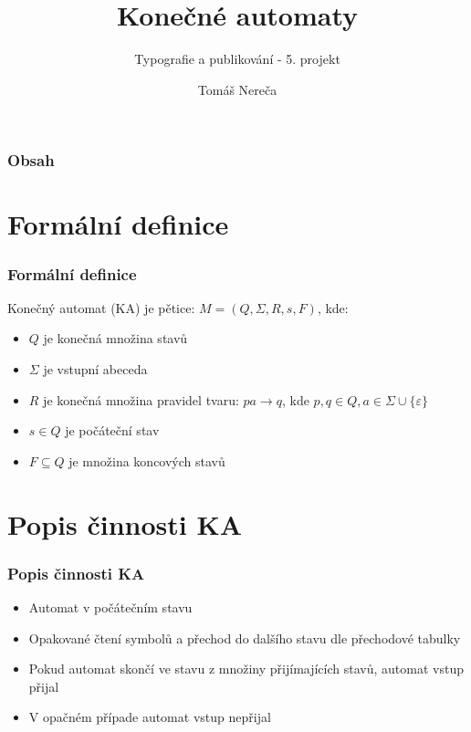 \documentclass{beamer}
\begin{document}
	\begin{frame}
		\title{Konečné automaty}
		\subtitle{Typografie a publikování - 5. projekt}
		\author{Tomáš Nereča}
		\maketitle
	\end{frame}
	
	\begin{frame}
		\frametitle{Obsah}
		\tableofcontents
	\end{frame}

	\section{Formální definice}
	\begin{frame}
		\frametitle{Formální definice}
		Konečný automat (KA) je pětice:
		$M = (Q, \Sigma, R, s, F)$, kde:
		\begin{itemize}
			\item $Q$ je konečná množina stavů
			\item $\Sigma$ je vstupní abeceda
			\item $R$ je konečná množina pravidel tvaru: $pa\rightarrow q$,
			kde $p, q \in Q, a \in \Sigma \cup \{\varepsilon\}$
			\item $s \in Q$ je počáteční stav
			\item $F \subseteq Q$ je množina koncových stavů
		\end{itemize}
	\end{frame}

	\section{Popis činnosti KA}
	\begin{frame}
		\frametitle{Popis činnosti KA}
		\begin{itemize}
			\item Automat v počátečním stavu
			\item Opakované čtení symbolů a přechod do dalšího stavu dle přechodové tabulky
			\item Pokud automat skončí ve stavu z množiny přijímajících stavů, automat vstup přijal
			\item V opačném případe automat vstup nepřijal
		\end{itemize}
	\end{frame}
\end{document}
